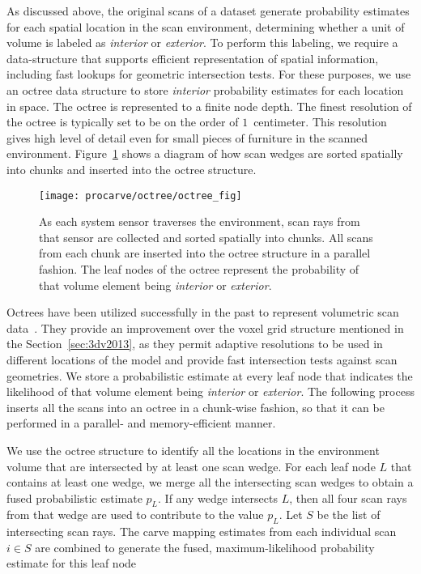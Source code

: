 \documentclass[12pt,onecolumn,oneside]{book}
\begin{document}
As discussed above, the original scans of a dataset generate probability estimates for each spatial location in the scan environment, determining whether a unit of volume is labeled as {\it interior} or {\it exterior}.  To perform this labeling, we require a data-structure that supports efficient representation of spatial information, including fast lookups for geometric intersection tests.  For these purposes, we use an octree data structure to store {\it interior} probability estimates for each location in space.  The octree is represented to a finite node depth.  The finest resolution of the octree is typically set to be on the order of $1$~centimeter.  This resolution gives high level of detail even for small pieces of furniture in the scanned environment.  Figure~\ref{fig:octree_population} shows a diagram of how scan wedges are sorted spatially into chunks and inserted into the octree structure.  

\begin{figure}[t]

	\centerline{\texttt{[image: procarve/octree/octree\_fig]}}

	\caption[Diagram of octree population.]{As each system sensor traverses the environment, scan rays from that sensor are collected and sorted spatially into chunks.  All scans from each chunk are inserted into the octree structure in a parallel fashion.  The leaf nodes of the octree represent the probability of that volume element being {\it interior} or {\it exterior}.}
	\label{fig:octree_population}
\end{figure}

Octrees have been utilized successfully in the past to represent volumetric scan data~\cite{Hernandez07,Octomap,OctreeSculpting}.  They provide an improvement over the voxel grid structure mentioned in the Section~\ref{sec:3dv2013}, as they permit adaptive resolutions to be used in different locations of the model and provide fast intersection tests against scan geometries.  We store a probabilistic estimate at every leaf node that indicates the likelihood of that volume element being {\it interior} or {\it exterior}.  The following process inserts all the scans into an octree in a chunk-wise fashion, so that it can be performed in a parallel- and memory-efficient manner.

We use the octree structure to identify all the locations in the environment volume that are intersected by at least one scan wedge.  For each leaf node $L$ that contains at least one wedge, we merge all the intersecting scan wedges to obtain a fused probabilistic estimate $p_L$.  If any wedge intersects $L$, then all four scan rays from that wedge are used to contribute to the value $p_L$.  Let $S$ be the list of intersecting scan rays.  The carve mapping estimates from each individual scan $i \in S$ are combined to generate the fused, maximum-likelihood probability estimate for this leaf node
\end{document}
